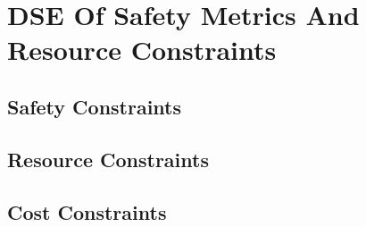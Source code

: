 \chapter{DSE Of Safety Metrics And Resource Constraints}\label{chapter:constraints}

\section{Safety Constraints}

\section{Resource Constraints}

\section{Cost Constraints}